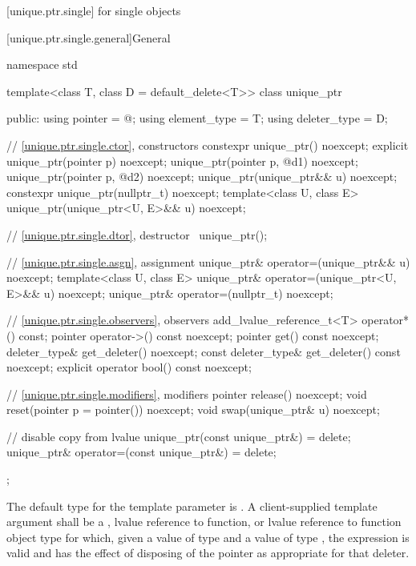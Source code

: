 [unique.ptr.single]{ for single objects}

[unique.ptr.single.general]{General}

%
\begin{codeblock}
namespace std {
  template<class T, class D = default_delete<T>> class unique_ptr {
  public:
    using pointer      = @\seebelow@;
    using element_type = T;
    using deleter_type = D;

    // \ref{unique.ptr.single.ctor}, constructors
    constexpr unique_ptr() noexcept;
    explicit unique_ptr(pointer p) noexcept;
    unique_ptr(pointer p, @\seebelow@ d1) noexcept;
    unique_ptr(pointer p, @\seebelow@ d2) noexcept;
    unique_ptr(unique_ptr&& u) noexcept;
    constexpr unique_ptr(nullptr_t) noexcept;
    template<class U, class E>
      unique_ptr(unique_ptr<U, E>&& u) noexcept;

    // \ref{unique.ptr.single.dtor}, destructor
    ~unique_ptr();

    // \ref{unique.ptr.single.asgn}, assignment
    unique_ptr& operator=(unique_ptr&& u) noexcept;
    template<class U, class E>
      unique_ptr& operator=(unique_ptr<U, E>&& u) noexcept;
    unique_ptr& operator=(nullptr_t) noexcept;

    // \ref{unique.ptr.single.observers}, observers
    add_lvalue_reference_t<T> operator*() const;
    pointer operator->() const noexcept;
    pointer get() const noexcept;
    deleter_type& get_deleter() noexcept;
    const deleter_type& get_deleter() const noexcept;
    explicit operator bool() const noexcept;

    // \ref{unique.ptr.single.modifiers}, modifiers
    pointer release() noexcept;
    void reset(pointer p = pointer()) noexcept;
    void swap(unique_ptr& u) noexcept;

    // disable copy from lvalue
    unique_ptr(const unique_ptr&) = delete;
    unique_ptr& operator=(const unique_ptr&) = delete;
  };
}
\end{codeblock}

\pnum
The default type for the template parameter  is
. A client-supplied template argument
 shall be a
,
lvalue reference to function, or
lvalue reference to function object type
for which, given
a value  of type  and a value
 of type , the expression
 is valid and has the effect of disposing of the
pointer as appropriate for that deleter.

